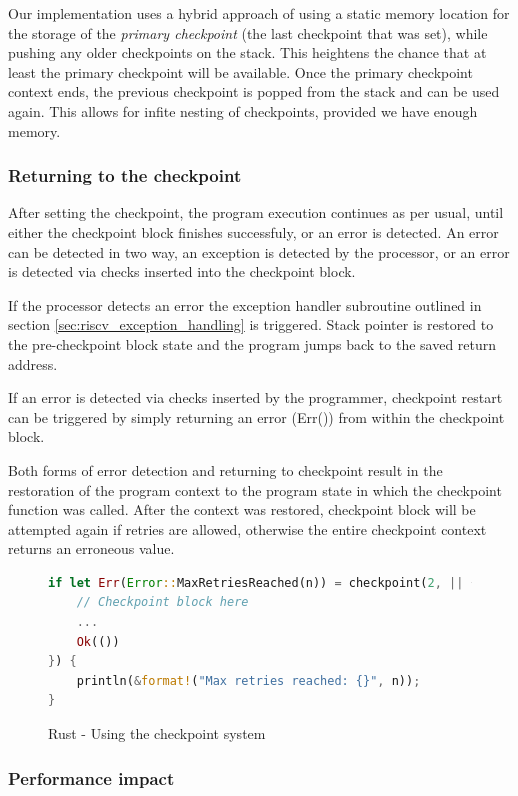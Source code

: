 \documentclass[12pt, letterpaper]{article}
\begin{document}
Our implementation uses a hybrid approach of using a static memory location for the storage of the \textit{primary checkpoint} (the last checkpoint that was set), while pushing any older checkpoints on the stack. This heightens the chance that at least the primary checkpoint will be available. Once the primary checkpoint context ends, the previous checkpoint is popped from the stack and can be used again. This allows for infite nesting of checkpoints, provided we have enough memory.

\subsubsection{Returning to the checkpoint}

After setting the checkpoint, the program execution continues as per usual, until either the checkpoint block finishes successfuly, or an error is detected. An error can be detected in two way, an exception is detected by the processor, or an error is detected via checks inserted into the checkpoint block.

If the processor detects an error the exception handler subroutine outlined in section \ref{sec:riscv_exception_handling} is triggered. Stack pointer is restored to the pre-checkpoint block state and the program jumps back to the saved return address.

If an error is detected via checks inserted by the programmer, checkpoint restart can be triggered by simply returning an error (Err()) from within the checkpoint block.

Both forms of error detection and returning to checkpoint result in the restoration of the program context to the program state in which the checkpoint function was called. After the context was restored, checkpoint block will be attempted again if retries are allowed, otherwise the entire checkpoint context returns an erroneous value.

\begin{figure}[!h]
\begin{lstlisting}[language=Rust]
if let Err(Error::MaxRetriesReached(n)) = checkpoint(2, || {
    // Checkpoint block here
    ...
    Ok(())
}) {
    println(&format!("Max retries reached: {}", n));
}
\end{lstlisting}
\caption{Rust - Using the checkpoint system}
\label{fig:rust_using_checkpoint}
\end{figure}

\subsubsection{Performance impact}
\end{document}
